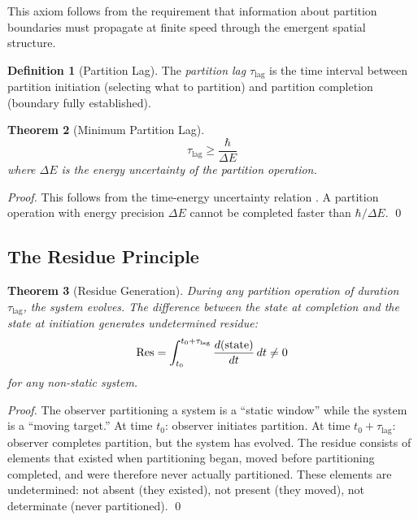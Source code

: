 \documentclass[twocolumn,10pt,a4paper]{article}
\newtheorem{theorem}{Theorem}[section]
\theoremstyle{definition}
\newtheorem{definition}[theorem]{Definition}
\theoremstyle{remark}
\newcommand{\Lag}{\tau_{\mathrm{lag}}}
\begin{document}
This axiom follows from the requirement that information about partition boundaries must propagate at finite speed through the emergent spatial structure.

\begin{definition}[Partition Lag]
The \emph{partition lag} $\Lag$ is the time interval between partition initiation (selecting what to partition) and partition completion (boundary fully established).
\end{definition}

\begin{theorem}[Minimum Partition Lag]
\label{thm:min-lag}
\begin{equation}
    \Lag \geq \frac{\hbar}{\Delta E}
\end{equation}
where $\Delta E$ is the energy uncertainty of the partition operation.
\end{theorem}

\begin{proof}
This follows from the time-energy uncertainty relation \citep{mandelstam1991,heisenberg1927}. A partition operation with energy precision $\Delta E$ cannot be completed faster than $\hbar/\Delta E$. \qed
\end{proof}

\subsection{The Residue Principle}

\begin{theorem}[Residue Generation]
\label{thm:residue}
During any partition operation of duration $\Lag$, the system evolves. The difference between the state at completion and the state at initiation generates \emph{undetermined residue}:
\begin{equation}
    \Residue = \int_{t_0}^{t_0 + \Lag} \frac{d(\text{state})}{dt} \, dt \neq 0
\end{equation}
for any non-static system.
\end{theorem}

\begin{proof}
The observer partitioning a system is a ``static window'' while the system is a ``moving target.'' At time $t_0$: observer initiates partition. At time $t_0 + \Lag$: observer completes partition, but the system has evolved. The residue consists of elements that existed when partitioning began, moved before partitioning completed, and were therefore never actually partitioned. These elements are undetermined: not absent (they existed), not present (they moved), not determinate (never partitioned). \qed
\end{proof}
\end{document}
